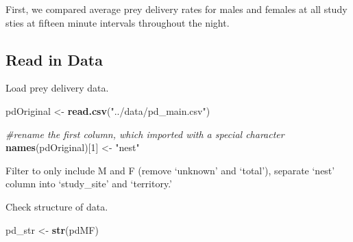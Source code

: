 \documentclass[]{article}
\newenvironment{Shaded}{\begin{snugshade}}{\end{snugshade}}
\newcommand{\CommentTok}[1]{\textcolor[rgb]{0.56,0.35,0.01}{\textit{#1}}}
\newcommand{\DataTypeTok}[1]{\textcolor[rgb]{0.13,0.29,0.53}{#1}}
\newcommand{\DecValTok}[1]{\textcolor[rgb]{0.00,0.00,0.81}{#1}}
\newcommand{\KeywordTok}[1]{\textcolor[rgb]{0.13,0.29,0.53}{\textbf{#1}}}
\newcommand{\NormalTok}[1]{#1}
\newcommand{\OperatorTok}[1]{\textcolor[rgb]{0.81,0.36,0.00}{\textbf{#1}}}
\newcommand{\OtherTok}[1]{\textcolor[rgb]{0.56,0.35,0.01}{#1}}
\newcommand{\StringTok}[1]{\textcolor[rgb]{0.31,0.60,0.02}{#1}}
\begin{document}
First, we compared average prey delivery rates for males and females at
all study sties at fifteen minute intervals throughout the night.

\hypertarget{read-in-data}{%
\subsection{Read in Data}\label{read-in-data}}

Load prey delivery data.

\begin{Shaded}
\begin{Highlighting}[]
\NormalTok{pdOriginal <-}\StringTok{ }\KeywordTok{read.csv}\NormalTok{(}\StringTok{"../data/pd_main.csv"}\NormalTok{)}

\CommentTok{#rename the first column, which imported with a special character}
\KeywordTok{names}\NormalTok{(pdOriginal)[}\DecValTok{1}\NormalTok{] <-}\StringTok{ "nest"}
\end{Highlighting}
\end{Shaded}

Filter to only include M and F (remove `unknown' and `total'), separate
`nest' column into `study\_site' and `territory.'

\begin{Shaded}
\end{Shaded}

Check structure of data.

\begin{Shaded}
\begin{Highlighting}[]
\NormalTok{pd_str <-}\StringTok{ }\KeywordTok{str}\NormalTok{(pdMF)}
\end{Highlighting}
\end{Shaded}
\end{document}
